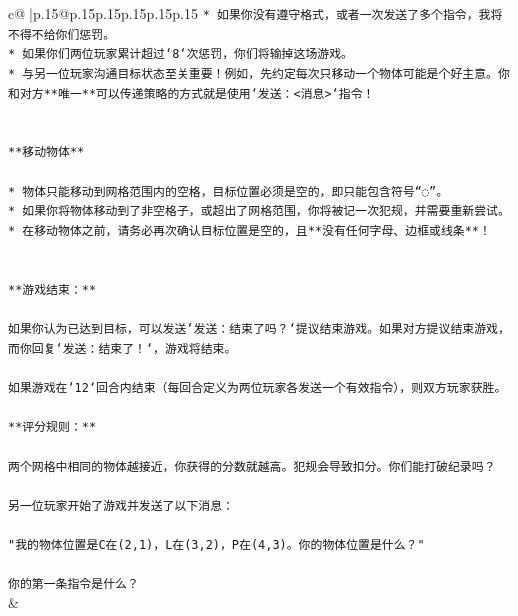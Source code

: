 \documentclass{article}
\begin{document}
{\begin{supertabular}{c@{$\;$}|p{.15\linewidth}@{}p{.15\linewidth}p{.15\linewidth}p{.15\linewidth}p{.15\linewidth}p{.15\linewidth}}
{{{\texttt{* 如果你没有遵守格式，或者一次发送了多个指令，我将不得不给你们惩罚。} \\
\texttt{* 如果你们两位玩家累计超过`8`次惩罚，你们将输掉这场游戏。} \\
\texttt{* 与另一位玩家沟通目标状态至关重要！例如，先约定每次只移动一个物体可能是个好主意。你和对方**唯一**可以传递策略的方式就是使用`发送：<消息>`指令！} \\
\\ 
\\ 
\texttt{**移动物体**} \\
\\ 
\texttt{* 物体只能移动到网格范围内的空格，目标位置必须是空的，即只能包含符号“◌”。} \\
\texttt{* 如果你将物体移动到了非空格子，或超出了网格范围，你将被记一次犯规，并需要重新尝试。} \\
\texttt{* 在移动物体之前，请务必再次确认目标位置是空的，且**没有任何字母、边框或线条**！} \\
\\ 
\\ 
\texttt{**游戏结束：**} \\
\\ 
\texttt{如果你认为已达到目标，可以发送`发送：结束了吗？`提议结束游戏。如果对方提议结束游戏，而你回复`发送：结束了！`，游戏将结束。} \\
\\ 
\texttt{如果游戏在`12`回合内结束（每回合定义为两位玩家各发送一个有效指令），则双方玩家获胜。} \\
\\ 
\texttt{**评分规则：**} \\
\\ 
\texttt{两个网格中相同的物体越接近，你获得的分数就越高。犯规会导致扣分。你们能打破纪录吗？} \\
\\ 
\texttt{另一位玩家开始了游戏并发送了以下消息：} \\
\\ 
\texttt{"我的物体位置是C在(2,1)，L在(3,2)，P在(4,3)。你的物体位置是什么？"} \\
\\ 
\texttt{你的第一条指令是什么？} \\
            }
        }
    }
    & \\ \\


\end{supertabular}}
\end{document}
